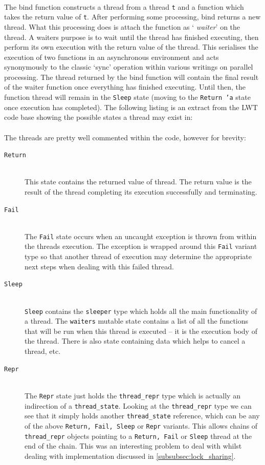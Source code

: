 \documentclass[12pt,twoside,notitlepage]{report}
\begin{document}
\hfill\\
The bind function constructs a thread from a thread {\tt t} and a function which takes the return value of {\tt t}. After performing some processing, bind returns a new thread. What this processing does is attach the function as `{\em
waiter}' on the thread. A waiters purpose is to wait until the thread has finished executing, then perform its own execution with the return value of the thread. This serialises the execution of two functions in an asynchronous
environment and acts synonymously to the classic `sync' operation within various writings on parallel processing\cite{cormen2009}. The thread returned by the bind function will contain the final result of the waiter function once
everything has finished executing. Until then, the function thread will remain in the {\tt Sleep} state (moving to the {\tt Return 'a} state once execution has completed). The following listing is an extract from the LWT code base
showing the possible states a thread may exist in:
\hfill\\

\hfill\\
The threads are pretty well commented within the code, however for brevity:
\begin{description}
\item[{\tt Return}]\hfill\\
This state contains the returned value of thread. The return value is the result of the thread completing its execution successfully and terminating.
\item[{\tt Fail}]\hfill\\
The {\tt Fail} state occurs when an uncaught exception is thrown from within the threads execution. The exception is wrapped around this {\tt Fail} variant type so that another thread of execution may determine the appropriate next steps when
dealing with this failed thread.
\item[{\tt Sleep}]\hfill\\
{\tt Sleep} contains the {\tt sleeper} type which holds all the main functionality of a thread. The {\tt waiters} mutable state contains a list of all the functions that will be run when this thread is executed -- it is the execution
body of the thread. There is also state containing data which helps to cancel a thread, etc.
\item[{\tt Repr}]\hfill\\
The {\tt Repr} state just holds the {\tt thread\_repr} type which is actually an indirection of a {\tt thread\_state}. Looking at the {\tt thread\_repr} type we can see that it simply holds another {\tt thread\_state} reference, which
can be any of the above {\tt Return, Fail, Sleep} or {\tt Repr} variants. This allows chains of {\tt thread\_repr} objects pointing to a {\tt Return, Fail} or {\tt Sleep} thread at the end of the chain. This was an interesting problem
to deal with whilst dealing with implementation discussed in \ref{subsubsec:lock_sharing}.
\end{description}
\end{document}

